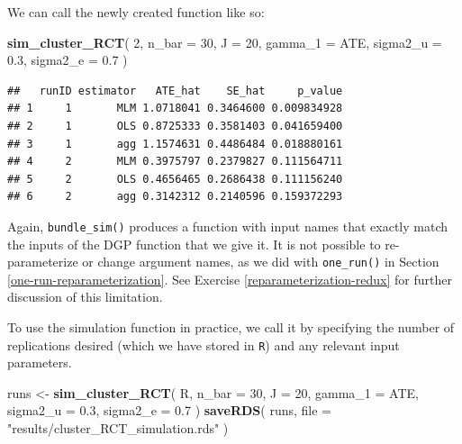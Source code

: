 \documentclass[
]{book}
\newenvironment{Shaded}{\begin{snugshade}}{\end{snugshade}}
\newcommand{\AttributeTok}[1]{\textcolor[rgb]{0.13,0.29,0.53}{#1}}
\newcommand{\DecValTok}[1]{\textcolor[rgb]{0.00,0.00,0.81}{#1}}
\newcommand{\FloatTok}[1]{\textcolor[rgb]{0.00,0.00,0.81}{#1}}
\newcommand{\FunctionTok}[1]{\textcolor[rgb]{0.13,0.29,0.53}{\textbf{#1}}}
\newcommand{\NormalTok}[1]{#1}
\newcommand{\OtherTok}[1]{\textcolor[rgb]{0.56,0.35,0.01}{#1}}
\newcommand{\StringTok}[1]{\textcolor[rgb]{0.31,0.60,0.02}{#1}}
\begin{document}
We can call the newly created function like so:

\begin{Shaded}
\begin{Highlighting}[]
\FunctionTok{sim\_cluster\_RCT}\NormalTok{( }\DecValTok{2}\NormalTok{, }
                 \AttributeTok{n\_bar =} \DecValTok{30}\NormalTok{, }\AttributeTok{J =} \DecValTok{20}\NormalTok{, }\AttributeTok{gamma\_1 =}\NormalTok{ ATE, }
                 \AttributeTok{sigma2\_u =} \FloatTok{0.3}\NormalTok{, }\AttributeTok{sigma2\_e =} \FloatTok{0.7}\NormalTok{ )}
\end{Highlighting}
\end{Shaded}

\begin{verbatim}
##   runID estimator   ATE_hat    SE_hat     p_value
## 1     1       MLM 1.0718041 0.3464600 0.009834928
## 2     1       OLS 0.8725333 0.3581403 0.041659400
## 3     1       agg 1.1574631 0.4486484 0.018880161
## 4     2       MLM 0.3975797 0.2379827 0.111564711
## 5     2       OLS 0.4656465 0.2686438 0.111156240
## 6     2       agg 0.3142312 0.2140596 0.159372293
\end{verbatim}

Again, \texttt{bundle\_sim()} produces a function with input names that exactly match the inputs of the DGP function that we give it.
It is not possible to re-parameterize or change argument names, as we did with \texttt{one\_run()} in Section \ref{one-run-reparameterization}.
See Exercise \ref{reparameterization-redux} for further discussion of this limitation.

To use the simulation function in practice, we call it by specifying the number of replications desired (which we have stored in \texttt{R}) and any relevant input parameters.

\begin{Shaded}
\begin{Highlighting}[]
\NormalTok{runs }\OtherTok{\textless{}{-}} \FunctionTok{sim\_cluster\_RCT}\NormalTok{( R, }
                         \AttributeTok{n\_bar =} \DecValTok{30}\NormalTok{, }\AttributeTok{J =} \DecValTok{20}\NormalTok{, }\AttributeTok{gamma\_1 =}\NormalTok{ ATE, }
                         \AttributeTok{sigma2\_u =} \FloatTok{0.3}\NormalTok{, }\AttributeTok{sigma2\_e =} \FloatTok{0.7}\NormalTok{ )}
\FunctionTok{saveRDS}\NormalTok{( runs, }\AttributeTok{file =} \StringTok{"results/cluster\_RCT\_simulation.rds"}\NormalTok{ )}
\end{Highlighting}
\end{Shaded}
\end{document}

